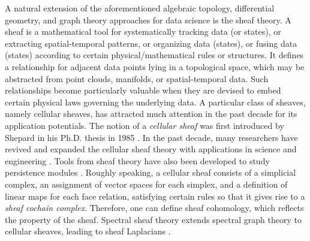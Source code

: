 \documentclass[11pt]{article}
\theoremstyle{definition}
\theoremstyle{definition}
\begin{document}
 {A natural extension of the aforementioned algebraic topology, differential geometry, and graph theory approaches for data science is the sheaf theory. }
A sheaf is a mathematical tool for systematically tracking data (or states), or extracting spatial-temporal patterns, or organizing data (states), or fusing data (states) according to certain physical/mathematical rules or structures. 
It defines a relationship for adjacent data points lying in a topological space, which may be abstracted from point clouds, manifolds, or spatial-temporal data. 
Such relationships become particularly valuable when they are devised to embed certain physical laws governing the underlying data. 
A particular class of sheaves, namely cellular sheaves, has attracted much attention in the past decade for its application potentials. 
The notion of a \emph{cellular sheaf} was first introduced by Shepard in his Ph.D. thesis in 1985 \cite{shepard1985cellular}. 
In the past decade, many researchers have revived and expanded the cellular sheaf theory with applications in science and engineering \cite{curry2014sheaves, hansen2019toward, topologicalsignalprocessing}. 
Tools from sheaf theory have also been developed to study persistence modules \cite{berkouk2021derived, Bubenik_2021, curry2014sheaves, hang2021correspondence}. 
Roughly speaking, a cellular sheaf consists of a simplicial complex, an assignment of vector spaces for each simplex, and a definition of linear maps for each face relation, satisfying certain rules so that it gives rise to a \emph{sheaf cochain complex}. 
Therefore, one can define sheaf cohomology, which reflects the property of the sheaf. 
Spectral sheaf theory extends spectral graph theory to cellular sheaves, leading to sheaf Laplacians \cite{hansen2019toward}. 
\end{document}
